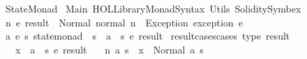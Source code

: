 %
\begin{isabellebody}%
%
%
\isadelimtheory
%
\endisadelimtheory
%
\isatagtheory
{}\isamarkupfalse%
\ StateMonad\isanewline
{}\ Main\ {\isachardoublequoteopen}HOL{\isacharminus}{\kern0pt}Library{\isachardot}{\kern0pt}Monad{\isacharunderscore}{\kern0pt}Syntax{\isachardoublequoteclose}\ Utils\ Solidity{\isacharunderscore}{\kern0pt}Symbex\isanewline
{}%
\endisatagtheory
{\isafoldtheory}%
%
\isadelimtheory
%
\endisadelimtheory
%
\isadelimdocument
%
\endisadelimdocument
%
\isatagdocument
%
\isamarkuptrue%
%
\endisatagdocument
{\isafolddocument}%
%
\isadelimdocument
%
\endisadelimdocument
{}\isamarkupfalse%
\ {\isacharparenleft}{\kern0pt}{\isacharprime}{\kern0pt}n{\isacharcomma}{\kern0pt}\ {\isacharprime}{\kern0pt}e{\isacharparenright}{\kern0pt}\ result\ {\isacharequal}{\kern0pt}\ Normal\ {\isacharparenleft}{\kern0pt}normal{\isacharcolon}{\kern0pt}\ {\isacharprime}{\kern0pt}n{\isacharparenright}{\kern0pt}\ {\isacharbar}{\kern0pt}\ Exception\ {\isacharparenleft}{\kern0pt}exception{\isacharcolon}{\kern0pt}\ {\isacharprime}{\kern0pt}e{\isacharparenright}{\kern0pt}\isanewline
\isanewline
{}\isamarkupfalse%
\ {\isacharparenleft}{\kern0pt}{\isacharprime}{\kern0pt}a{\isacharcomma}{\kern0pt}\ {\isacharprime}{\kern0pt}e{\isacharcomma}{\kern0pt}\ {\isacharprime}{\kern0pt}s{\isacharparenright}{\kern0pt}\ state{\isacharunderscore}{\kern0pt}monad\ {\isacharequal}{\kern0pt}\ {\isachardoublequoteopen}{\isacharprime}{\kern0pt}s\ {\isasymRightarrow}\ {\isacharparenleft}{\kern0pt}{\isacharprime}{\kern0pt}a\ {\isasymtimes}\ {\isacharprime}{\kern0pt}s{\isacharcomma}{\kern0pt}\ {\isacharprime}{\kern0pt}e{\isacharparenright}{\kern0pt}\ result{\isachardoublequoteclose}\isanewline
\isanewline
{}\isamarkupfalse%
\ result{\isacharunderscore}{\kern0pt}cases{\isacharbrackleft}{\kern0pt}cases\ type{\isacharcolon}{\kern0pt}\ result{\isacharbrackright}{\kern0pt}{\isacharcolon}{\kern0pt}\isanewline
\ \ \ x\ {\isacharcolon}{\kern0pt}{\isacharcolon}{\kern0pt}\ {\isachardoublequoteopen}{\isacharparenleft}{\kern0pt}{\isacharprime}{\kern0pt}a\ {\isasymtimes}\ {\isacharprime}{\kern0pt}s{\isacharcomma}{\kern0pt}\ {\isacharprime}{\kern0pt}e{\isacharparenright}{\kern0pt}\ result{\isachardoublequoteclose}\isanewline
\ \ \ {\isacharparenleft}{\kern0pt}n{\isacharparenright}{\kern0pt}\ a\ s\ \ {\isachardoublequoteopen}x\ {\isacharequal}{\kern0pt}\ Normal\ {\isacharparenleft}{\kern0pt}a{\isacharcomma}{\kern0pt}\ s{\isacharparenright}{\kern0pt}{\isachardoublequoteclose}\isanewline

\end{isabellebody}
